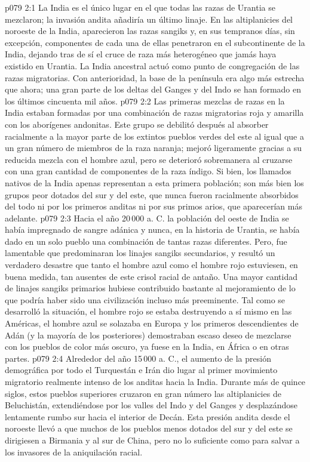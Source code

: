 \vs p079 2:1 La India es el único lugar en el que todas las razas de Urantia se mezclaron; la invasión andita añadiría un último linaje. En las altiplanicies del noroeste de la India, aparecieron las razas sangiks y, en sus tempranos días, sin excepción, componentes de cada una de ellas penetraron en el subcontinente de la India, dejando tras de sí el cruce de raza más heterogéneo que jamás haya existido en Urantia. La India ancestral actuó como punto de congregación de las razas migratorias. Con anterioridad, la base de la península era algo más estrecha que ahora; una gran parte de los deltas del Ganges y del Indo se han formado en los últimos cincuenta mil años.
\vs p079 2:2 Las primeras mezclas de razas en la India estaban formadas por una combinación de razas migratorias roja y amarilla con los aborígenes andonitas. Este grupo se debilitó después al absorber racialmente a la mayor parte de los extintos pueblos verdes del este al igual que a un gran número de miembros de la raza naranja; mejoró ligeramente gracias a su reducida mezcla con el hombre azul, pero se deterioró sobremanera al cruzarse con una gran cantidad de componentes de la raza índigo. Si bien, los llamados nativos de la India apenas representan a esta primera población; son más bien los grupos peor dotados del sur y del este, que nunca fueron racialmente absorbidos del todo ni por los primeros anditas ni por sus primos arios, que aparecerían más adelante.
\vs p079 2:3 \pc Hacia el año 20\,000 a. C. la población del oeste de India se había impregnado de sangre adánica y nunca, en la historia de Urantia, se había dado en un solo pueblo una combinación de tantas razas diferentes. Pero, fue lamentable que predominaran los linajes sangiks secundarios, y resultó un verdadero desastre que tanto el hombre azul como el hombre rojo estuviesen, en buena medida, tan ausentes de este crisol racial de antaño. Una mayor cantidad de linajes sangiks primarios hubiese contribuido bastante al mejoramiento de lo que podría haber sido una civilización incluso más preeminente. Tal como se desarrolló la situación, el hombre rojo se estaba destruyendo a sí mismo en las Américas, el hombre azul se solazaba en Europa y los primeros descendientes de Adán (y la mayoría de los posteriores) demostraban escaso deseo de mezclarse con los pueblos de color más oscuro, ya fuese en la India, en África o en otras partes.
\vs p079 2:4 \pc Alrededor del año 15\,000 a. C., el aumento de la presión demográfica por todo el Turquestán e Irán dio lugar al primer movimiento migratorio realmente intenso de los anditas hacia la India. Durante más de quince siglos, estos pueblos superiores cruzaron en gran número las altiplanicies de Beluchistán, extendiéndose por los valles del Indo y del Ganges y desplazándose lentamente rumbo sur hacia el interior de Decán. Esta presión andita desde el noroeste llevó a que muchos de los pueblos menos dotados del sur y del este se dirigiesen a Birmania y al sur de China, pero no lo suficiente como para salvar a los invasores de la aniquilación racial.
